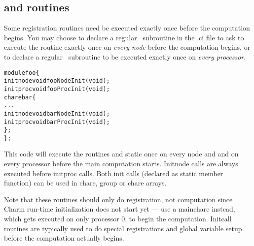 \subsection{ and  routines}

\label{initcall}
Some registration routines need be executed exactly once
before the computation begins. You may choose to 
declare a regular  \CC\ subroutine  in the .ci file
to ask \charmpp to execute the routine exactly once on {\em every node} 
before the computation begins, or to declare a regular  \CC\ subroutine 
 to be executed exactly once on {\em every processor}.

\begin{alltt}
module foo \{
    initnode void fooNodeInit(void);
    initproc void fooProcInit(void);
    chare bar \{
        ...
        initnode void barNodeInit(void);
        initproc void barProcInit(void);
    \};
\};
\end{alltt}

This code will execute the routines  and static 
 once on every node and 
and  on every processor before the main computation 
starts.
Initnode calls are always executed before initproc calls.
Both init calls (declared as static member function) can be used in chare, 
group or chare arrays.

Note that these routines should only do registration, not computation since
Charm run-time initialization does not start yet ---
use a mainchare instead, which gets executed on only processor 0,
to begin the computation.  Initcall routines are typically
used to do special registrations and global variable setup
before the computation actually begins.

